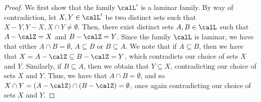 \projectionLaminarFamily*
\begin{proof}
    We first show that the family $\calL'$ is a laminar family. By way of contradiction, let $X,Y \in \calL'$ be two distinct sets such that $X-Y, Y-X, X\cap Y \not = \emptyset$. Then, there exist distinct sets $A, B \in \calL$ such that $A - \calZ = X$ and $B - \calZ = Y$. Since the family $\calL$ is laminar, we have that either $A\cap B = \emptyset$, $A \subseteq B$ or $B\subseteq A$. We note that if $A\subseteq B$, then we have that $X = A - \calZ \subseteq B - \calZ = Y$, which contradicts our choice of sets $X$ and $Y$. Similarly, if $B\subseteq A$, then we obtain that $Y \subseteq X$, contradicting our choice of sets $X$ and $Y$. Thus, we have that $A\cap B = \emptyset$, and so $X\cap Y = (A - \calZ)\cap(B - \calZ) = \emptyset$, once again contradicting our choice of sets $X$ and $Y$. 


\end{proof}
